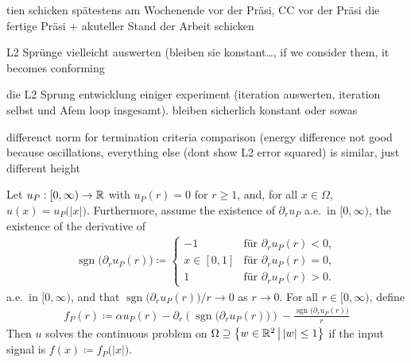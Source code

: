 \begin{frame}
  tien schicken spätestens am Wochenende vor der Präsi, CC vor der Präsi
  die fertige Präsi + akuteller Stand der Arbeit schicken
\end{frame}

\begin{frame}
  L2 Sprünge vielleicht auswerten (bleiben sie konstant\ldots, if we consider
  them, it becomes conforming

  die L2 Sprung entwicklung einiger experiment (iteration auswerten, iteration 
  selbst und Afem loop insgesamt). bleiben sicherlich konstant oder sowas
\end{frame}

\begin{frame}
  differenct norm for termination criteria comparison (energy difference not
  good because oscillations, everything else (dont show L2 error squared)
  is similar, just different height
\end{frame}

\begin{frame}
  Let $u_P:[0,\infty)\to\mathbb{R}$ with $u_P(r)=0$ for $r\geq 1$,
  and, for all $x\in\Omega$, $u(x)= u_P\big(|x|\big)$. 
  \pause
  Furthermore, assume the existence  of $\partial_r u_P$ a.e.\ in $[0,\infty)$,
  the existence of the derivative of
  \begin{align*}
    \operatorname{sgn}\big(\partial_r u_P(r)\big)
    \coloneqq
    \begin{cases}
      -1 &\text{für }\partial_r u_P(r)<0,\\
      x\in[0,1] &\text{für }\partial_r u_P(r)=0,\\ 
      1 &\text{für }\partial_r u_P(r)>0.
    \end{cases}
  \end{align*}
  a.e.\ in $[0,\infty)$, and
  that $\operatorname{sgn}\big(\partial_r u_P(r)\big)/r\to 0$ as $r\to 0$.
  \pause
  For all $r\in[0,\infty)$, define 
  \begin{align*}
    f_P(r)
    \coloneqq 
    \alpha u_P(r) - \partial_r\left(\operatorname{sgn}\big(\partial_r u_P(r)\big)\right) 
    - \frac{\operatorname{sgn}\big(\partial_r u_P(r)\big)}{r}
  \end{align*}
  \pause
  Then $u$ solves the continuous problem
  on $\Omega\supseteq \left\{w\in\mathbb{R}^2\,\middle|\, |w|\leq 1\right\}$ if
  the input signal is $f(x)\coloneqq f_P\big(|x|\big)$.
\end{frame}
